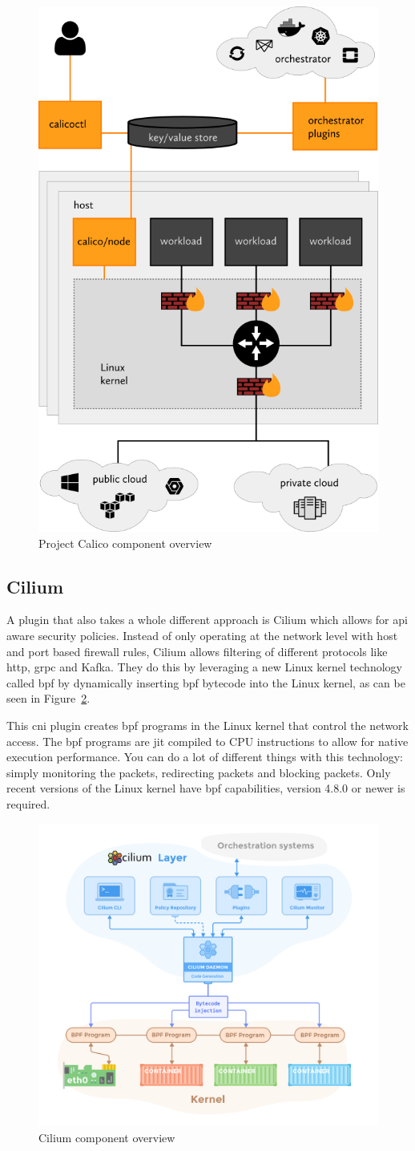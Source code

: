 \begin{figure}
    \centering
    \includegraphics[width=0.4\columnwidth]{images/calico-arch}
    \caption{Project Calico component overview \cite{calico_about}}
    \label{fig:calico-arc}
\end{figure}

\subsection{Cilium}
A plugin that also takes a whole different approach is Cilium\cite{cilium} which allows for \gls{api} aware security policies. Instead of only operating at the network level with host and port based firewall rules, Cilium allows filtering of different protocols like \gls{http}, \gls{grpc}\cite{grpc} and Kafka\cite{kafka}. They do this by leveraging a new Linux kernel technology called \gls{bpf}\cite{mccanne1993bsd, cilium_bpf} by dynamically inserting \gls{bpf} bytecode into the Linux kernel, as can be seen in Figure~\ref{fig:cilium-arch}. 

This \gls{cni} plugin creates \gls{bpf} programs in the Linux kernel that control the network access. The \gls{bpf} programs are \gls{jit} compiled to CPU instructions to allow for native execution performance. You can do a lot of different things with this technology: simply monitoring the packets, redirecting packets and blocking packets. Only recent versions of the Linux kernel have \gls{bpf} capabilities, version 4.8.0 or newer is required. 

\begin{figure}
    \centering
    \includegraphics[width=0.7\columnwidth]{images/cilium-arch}
    \caption{Cilium component overview \cite{cilium_concepts}}
    \label{fig:cilium-arch}
\end{figure}
